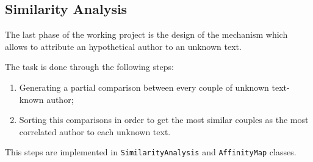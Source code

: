 \documentclass[a4paper,11pt, twoside]{article}
\begin{document}
	
	\subsection{Similarity Analysis}
		\noindent
		The last phase of the working project is the design of the mechanism which allows to attribute an hypothetical author to an unknown text.
		
		\noindent
		The task is done through the following steps: 
		\begin{enumerate}
			\item Generating a partial comparison between every couple of unknown text-known author;
			\item Sorting this comparisons in order to get the most similar couples as the most correlated author to each unknown text.
		\end{enumerate}

		\noindent
		This steps are implemented in \lstinline|SimilarityAnalysis| and \lstinline|AffinityMap| classes.

		\bigskip
\end{document}
